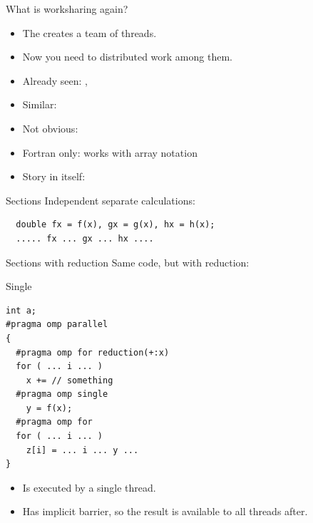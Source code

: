 
\begin{numberedframe}{What is worksharing again?}
  \begin{itemize}
  \item The  creates a team of threads.
  \item Now you need to distributed work among them.
  \item Already seen: , 
  \item Similar: 
  \item Not obvious: 
  \item Fortran only:  works with array notation
  \item Story in itself: 
  \end{itemize}
\end{numberedframe}

\begin{numberedframe}{Sections}
Independent separate calculations:
\begin{lstlisting}
  double fx = f(x), gx = g(x), hx = h(x);
  ..... fx ... gx ... hx ....
\end{lstlisting}
\end{numberedframe}

\begin{numberedframe}{Sections with reduction}
Same code, but with reduction:
\end{numberedframe}

\begin{numberedframe}{Single}
\begin{lstlisting}
int a;
#pragma omp parallel
{
  #pragma omp for reduction(+:x)
  for ( ... i ... )
    x += // something
  #pragma omp single
    y = f(x);
  #pragma omp for
  for ( ... i ... )
    z[i] = ... i ... y ...
}
\end{lstlisting}
  \begin{itemize}
  \item Is executed by a single thread.
  \item Has implicit barrier, so the result is available to all threads
    after.
  \end{itemize}
\end{numberedframe}


